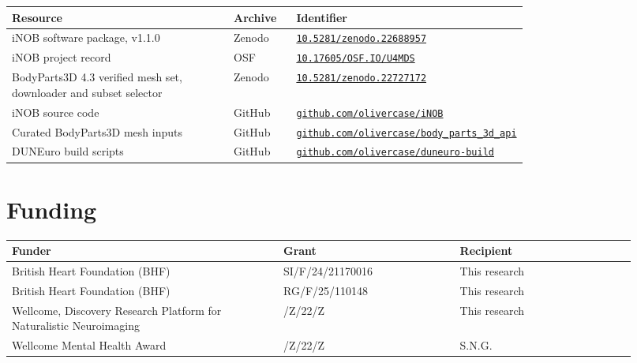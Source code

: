 \documentclass[11pt]{article}
\newcommand{\doilink}[1]{\href{https://doi.org/#1}{\nolinkurl{#1}}}
\begin{document}
\begin{center}
\small
\renewcommand{\arraystretch}{1.35}
\begin{tabular}{@{}>{\raggedright\arraybackslash}p{0.43\linewidth}l>{\raggedright\arraybackslash}p{0.33\linewidth}@{}}
\toprule
\textbf{Resource} & \textbf{Archive} & \textbf{Identifier} \\
\midrule
iNOB software package, v1.1.0~\citep{case2026inobzenodo} & Zenodo & \doilink{10.5281/zenodo.22688957} \\
iNOB project record~\citep{case2026inobosf} & OSF & \doilink{10.17605/OSF.IO/U4MDS} \\
BodyParts3D 4.3 verified mesh set, downloader and subset selector~\citep{case2026bodyparts} & Zenodo & \doilink{10.5281/zenodo.22727172} \\
\midrule
iNOB source code & GitHub & \href{https://github.com/olivercase/iNOB}{\nolinkurl{github.com/olivercase/iNOB}} \\
Curated BodyParts3D mesh inputs & GitHub & \href{https://github.com/olivercase/body_parts_3d_api}{\nolinkurl{github.com/olivercase/body_parts_3d_api}} \\
DUNEuro build scripts & GitHub & \href{https://github.com/olivercase/duneuro-build}{\nolinkurl{github.com/olivercase/duneuro-build}} \\
\bottomrule
\end{tabular}
\end{center}

\section{Funding}\label{funding}

\begin{center}
\small
\renewcommand{\arraystretch}{1.35}
\begin{tabular}{@{}>{\raggedright\arraybackslash}p{0.40\linewidth}>{\raggedright\arraybackslash}p{0.26\linewidth}>{\raggedright\arraybackslash}p{0.26\linewidth}@{}}
\toprule
\textbf{Funder} & \textbf{Grant} & \textbf{Recipient} \\
\midrule
British Heart Foundation (BHF) & SI/F/24/21170016 & This research \\
British Heart Foundation (BHF) & RG/F/25/110148 & This research \\
Wellcome, Discovery Research Platform for Naturalistic Neuroimaging & 226793/Z/22/Z & This research \\
Wellcome Mental Health Award & 226778/Z/22/Z & S.N.G. \\
\bottomrule
\end{tabular}
\end{center}
\end{document}
